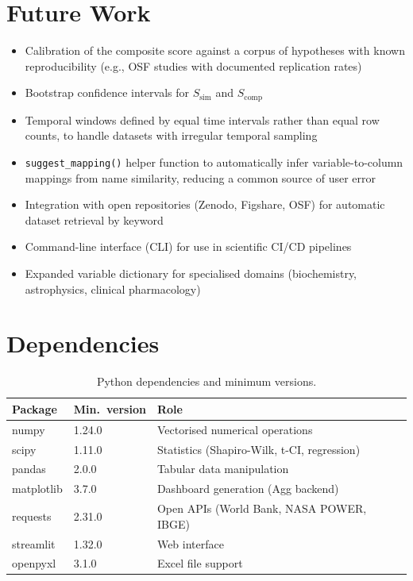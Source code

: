 \documentclass[12pt,a4paper]{article}
\begin{document}
\section{Future Work}

\begin{itemize}[leftmargin=2em]
  \item Calibration of the composite score against a corpus of hypotheses with known
    reproducibility (e.g., OSF studies with documented replication rates)
  \item Bootstrap confidence intervals for $S_{\text{sim}}$ and $S_{\text{comp}}$
  \item Temporal windows defined by equal time intervals rather than equal row counts,
    to handle datasets with irregular temporal sampling
  \item \texttt{suggest\_mapping()} helper function to automatically infer variable-to-column
    mappings from name similarity, reducing a common source of user error
  \item Integration with open repositories (Zenodo, Figshare, OSF) for automatic
    dataset retrieval by keyword
  \item Command-line interface (CLI) for use in scientific CI/CD pipelines
  \item Expanded variable dictionary for specialised domains (biochemistry,
    astrophysics, clinical pharmacology)
\end{itemize}

\section{Dependencies}

\begin{table}[h!]
\centering
\small
\begin{tabular}{lll}
\toprule
\textbf{Package} & \textbf{Min.\ version} & \textbf{Role} \\
\midrule
numpy      & 1.24.0 & Vectorised numerical operations \\
scipy      & 1.11.0 & Statistics (Shapiro-Wilk, t-CI, regression) \\
pandas     & 2.0.0  & Tabular data manipulation \\
matplotlib & 3.7.0  & Dashboard generation (Agg backend) \\
requests   & 2.31.0 & Open APIs (World Bank, NASA POWER, IBGE) \\
streamlit  & 1.32.0 & Web interface \\
openpyxl   & 3.1.0  & Excel file support \\
\bottomrule
\end{tabular}
\caption{Python dependencies and minimum versions.}
\end{table}
\end{document}

